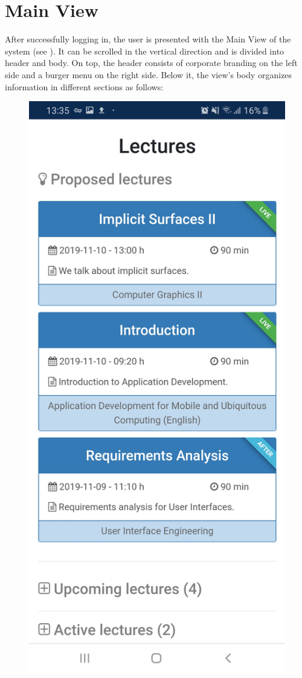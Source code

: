 \section{Main View}
\label{section:soa:mainview}
After successfully logging in, the user is presented with the Main View of the system (see ).
It can be scrolled in the vertical direction and is divided into header and body. On top, the header consists of corporate branding on the left side and a burger menu on the right side. Below it, the view's body organizes information in different sections as follows:

\begin{figure}
	\centering
	\begin{minipage}[t]{.5\textwidth}
		\centering
		\includegraphics[width=0.95\linewidth]{screenshots/main_view_1.jpg}

\end{minipage}
\end{figure}
